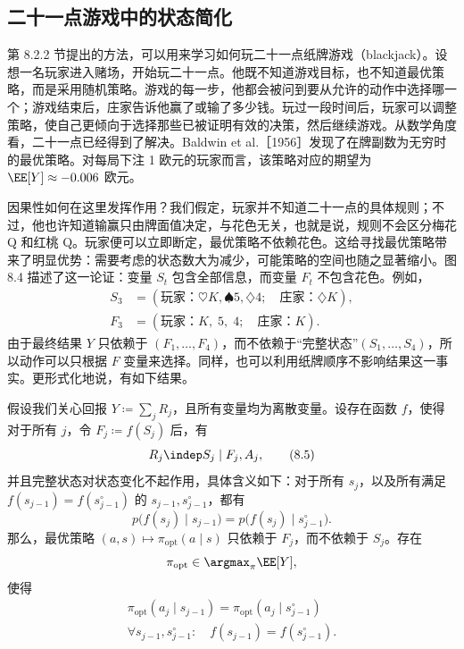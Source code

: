 \subsection{二十一点游戏中的状态简化}
\label{sec:ch08-blackjack}

第 8.2.2 节提出的方法，可以用来学习如何玩二十一点纸牌游戏（blackjack）。设想一名玩家进入赌场，开始玩二十一点。他既不知道游戏目标，也不知道最优策略，而是采用随机策略。游戏的每一步，他都会被问到要从允许的动作中选择哪一个；游戏结束后，庄家告诉他赢了或输了多少钱。玩过一段时间后，玩家可以调整策略，使自己更倾向于选择那些已被证明有效的决策，然后继续游戏。从数学角度看，二十一点已经得到了解决。Baldwin et al.［1956］发现了在牌副数为无穷时的最优策略。对每局下注 1 欧元的玩家而言，该策略对应的期望为 $\EE[Y]\approx-0.006$ 欧元。

因果性如何在这里发挥作用？我们假定，玩家并不知道二十一点的具体规则；不过，他也许知道输赢只由牌面值决定，与花色无关，也就是说，规则不会区分梅花 Q 和红桃 Q。玩家便可以立即断定，最优策略不依赖花色。这给寻找最优策略带来了明显优势：需要考虑的状态数大为减少，可能策略的空间也随之显著缩小。图 8.4 描述了这一论证：变量 $S_t$ 包含全部信息，而变量 $F_t$ 不包含花色。例如，
\[
 \begin{aligned}
 S_3&=(\text{玩家：}\heartsuit K,\spadesuit5,\diamondsuit4;\quad
       \text{庄家：}\diamondsuit K),\\
 F_3&=(\text{玩家：}K,\;5,\;4;\quad \text{庄家：}K).
 \end{aligned}
\]
由于最终结果 $Y$ 只依赖于 $(F_1,\ldots,F_4)$，而不依赖于“完整状态”$(S_1,\ldots,S_4)$，所以动作可以只根据 $F$ 变量来选择。同样，也可以利用纸牌顺序不影响结果这一事实。更形式化地说，有如下结果。



\begin{proposition}[状态简化]
假设我们关心回报 $Y\coloneqq\sum_jR_j$，且所有变量均为离散变量。设存在函数 $f$，使得对于所有 $j$，令 $F_j\coloneqq f(S_j)$ 后，有
\begin{equation}
 R_j\indep S_j\mid F_j,A_j,
 \tag{8.5}
\end{equation}
并且完整状态对状态变化不起作用，具体含义如下：对于所有 $s_j$，以及所有满足 $f(s_{j-1})=f(s^\circ_{j-1})$ 的 $s_{j-1},s^\circ_{j-1}$，都有
\begin{equation}
 p\bigl(f(s_j)\mid s_{j-1}\bigr)
 =p\bigl(f(s_j)\mid s^\circ_{j-1}\bigr).
 \tag{8.6}
\end{equation}
那么，最优策略 $(a,s)\mapsto\pi_{\mathrm{opt}}(a\mid s)$ 只依赖于 $F_j$，而不依赖于 $S_j$。存在
\[
 \pi_{\mathrm{opt}}\in\argmax_{\pi}\EE[Y],
\]
使得
\[
 \begin{gathered}
 \pi_{\mathrm{opt}}(a_j\mid s_{j-1})
 =\pi_{\mathrm{opt}}(a_j\mid s^\circ_{j-1})\\
 \forall s_{j-1},s^\circ_{j-1}:\quad f(s_{j-1})=f(s^\circ_{j-1}).
 \end{gathered}
\]
\end{proposition}

